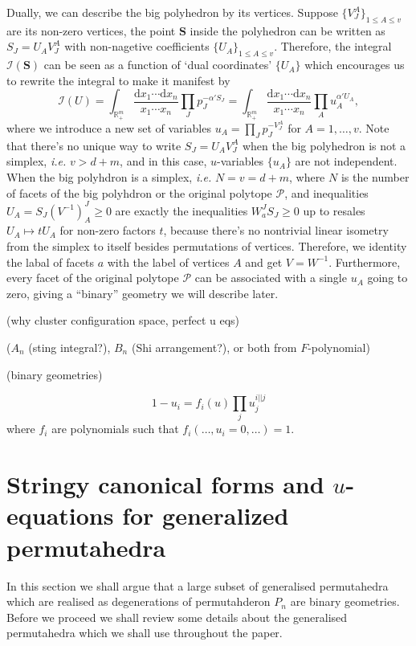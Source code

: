 \documentclass[hidelinks,12pt]{article}
\begin{document}
Dually, we can describe the big polyhedron by its vertices. Suppose 
$\{V_J^A\}_{1\leq A\leq v}$ are its non-zero vertices, the point $\mathbf S$ inside 
the polyhedron can be written as $S_J = U_A V^A_J$ with non-nagetive coefficients 
$\{U_A\}_{1\leq A\leq v}$.  Therefore, the integral $\mathcal I(\mathbf S)$
can be seen as a function of `dual coordinates' $\{U_A\}$ which encourages us to 
rewrite the integral to make it manifest by
\[
	\mathcal I(U)=
	\int_{\mathbb R_+^m}\frac{\mathrm d x_1\cdots \mathrm d x_n}{x_1\cdots x_n}
	\prod_{J}p_J^{-\alpha' S_J}
	=
	\int_{\mathbb R_+^m}\frac{\mathrm d x_1\cdots \mathrm d x_n}{x_1\cdots x_n}
	\prod_{A}u_A^{\alpha' U_A},
\]
where we introduce a new set of variables $u_A = \prod_J p_J^{-V_J^A}$ for 
$A=1,\dots,v$. Note that there's no unique way to write $S_J=U_AV_J^A$ when
the big polyhedron is not a simplex, \textit{i.e.} $v>d+m$, and in this case,
$u$-variables $\{u_A\}$ are not independent. 
When the big polyhdron is a simplex, \textit{i.e.} $N=v=d+m$, where $N$ is 
the number of facets of the big polyhdron or the original polytope $\mathcal P$,
and inequalities $U_A=S_J(V^{-1})^J_A\geq 0$ are exactly the inequalities
$W_a^J S_J\geq 0$ up to resales $U_A\mapsto t U_A$ for non-zero factors $t$, because
there's no nontrivial linear isometry from the simplex to itself besides permutations
of vertices. Therefore, we identity the labal of facets $a$ with the label of 
vertices $A$ and get $V=W^{-1}$. Furthermore, every facet of the original polytope
$\mathcal P$ can be associated with a single $u_A$ going to zero, 
giving a “binary” geometry we will describe later.

(why cluster configuration space, perfect u eqs)

($A_n$ (sting integral?), $B_n$ (Shi arrangement?), or both from $F$-polynomial)

(binary geometries)

\[
	1-u_i=f_i(u)\prod_{j}u_j^{i||j}
\]
where $f_i$ are polynomials such that $f_i(\dots,u_i=0,\dots)=1$.

\newpage
\section{Stringy canonical forms and $u$-equations for generalized permutahedra}
In this section we shall argue that  a large subset of generalised permutahedra which are realised as degenerations of permutahderon $P_n$ are binary geometries. Before we proceed we shall review some details about the generalised permutahedra which we shall use throughout the paper.
\end{document}
